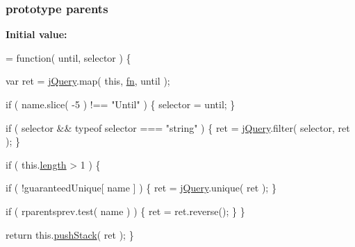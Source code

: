 \subsubsection[{parents}]{ {\bf prototype} parents}\label{jquery-1_810_82-vsdoc_8js_a73895b5ab8d34f0181c620bc3a166cad}
{\bfseries Initial value\+:}
\begin{DoxyCode}
= \textcolor{keyword}{function}( until, selector ) \{


        var ret = \hyperlink{jquery-1_810_82-vsdoc_8js_add5237586d970a38a81f990e8eb28c6c}{jQuery}.map( \textcolor{keyword}{this}, \hyperlink{jquery-1_810_82-vsdoc_8js_acef6bdaf6b9b20fdcca1ea86f0902c3b}{fn}, until );

        \textcolor{keywordflow}{if} ( name.slice( -5 ) !== \textcolor{stringliteral}{"Until"} ) \{
            selector = until;
        \}

        \textcolor{keywordflow}{if} ( selector && typeof selector === \textcolor{stringliteral}{"string"} ) \{
            ret = \hyperlink{jquery-1_810_82-vsdoc_8js_add5237586d970a38a81f990e8eb28c6c}{jQuery}.filter( selector, ret );
        \}

        \textcolor{keywordflow}{if} ( this.\hyperlink{jquery-1_810_82-vsdoc_8js_aa7de35d58da66d9944ab9cbe82c19640}{length} > 1 ) \{
            
            \textcolor{keywordflow}{if} ( !guaranteedUnique[ name ] ) \{
                ret = \hyperlink{jquery-1_810_82-vsdoc_8js_add5237586d970a38a81f990e8eb28c6c}{jQuery}.unique( ret );
            \}

            
            \textcolor{keywordflow}{if} ( rparentsprev.test( name ) ) \{
                ret = ret.reverse();
            \}
        \}

        \textcolor{keywordflow}{return} this.\hyperlink{jquery-1_810_82-vsdoc_8js_afc3a7db1ef2b526338c06c07cecccd44}{pushStack}( ret );
    \}
\end{DoxyCode}
\hypertarget{jquery-1_810_82-vsdoc_8js_ae2d1b0226f1427006ca38baad3dd6968}{}
